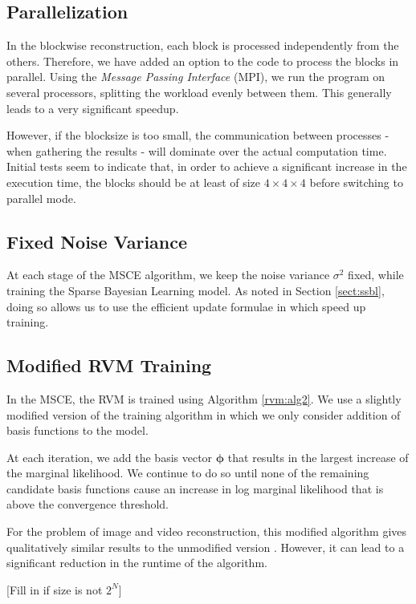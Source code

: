 \subsection{Parallelization}
In the blockwise reconstruction, each block is processed independently from the others.
Therefore, we have added an option to the code to process the blocks in parallel.
Using the \emph{Message Passing Interface} (MPI), we run the program on several processors, splitting the workload evenly between them. This generally leads to a very significant speedup.

However, if the blocksize is too small, the communication between processes - when gathering the results - will dominate over the actual computation time.
Initial tests seem to indicate that, in order to achieve a significant increase in the execution time, the blocks should be at least of size $4\times4\times4$ before switching to parallel mode.


\subsection{Fixed Noise Variance}
At each stage of the MSCE algorithm, we keep the noise variance $\sigma^2$ fixed, while training the Sparse Bayesian Learning model.
As noted in Section \ref{sect:ssbl}, doing so allows us to use the efficient update formulae in \cite{tipping2003} which speed up training.

\subsection{Modified RVM Training}
In the MSCE, the RVM is trained using Algorithm \ref{rvm:alg2}.
We use a slightly modified version of the training algorithm in which we only consider addition of basis functions to the model.

At each iteration, we add the basis vector $\bm\phi$ that results in the largest increase of the marginal likelihood.
We continue to do so until none of the remaining candidate basis functions cause an increase in log marginal likelihood that is above the convergence threshold.

For the problem of image and video reconstruction, this modified algorithm gives qualitatively similar results to the unmodified version \cite{pilikos2014}. However, it can lead to a significant reduction in the runtime of the algorithm.



[Fill in if size is not $2^N$]